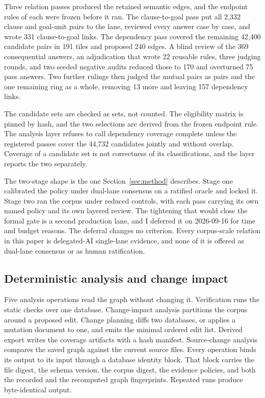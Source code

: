 Three relation passes produced the retained semantic edges, and the endpoint rules of each were frozen before it ran. The clause-to-goal pass put all 2{,}332 clause and goal-unit pairs to the lane, reviewed every answer case by case, and wrote 331 clause-to-goal links. The dependency pass covered the remaining 42{,}400 candidate pairs in 191 tiles and proposed 240 edges. A blind review of the 369 consequential answers, an adjudication that wrote 22 reusable rules, three judging rounds, and two seeded negative audits reduced those to 170 and overturned 75 pass answers. Two further rulings then judged the mutual pairs as pairs and the one remaining ring as a whole, removing 13 more and leaving 157 dependency links.

The candidate sets are checked as sets, not counted. The eligibility matrix is pinned by hash, and the two selections are derived from the frozen endpoint rule. The analysis layer refuses to call dependency coverage complete unless the registered passes cover the 44{,}732 candidates jointly and without overlap. Coverage of a candidate set is not correctness of its classifications, and the layer reports the two separately.

The two-stage shape is the one Section~\ref{sec:method} describes. Stage one calibrated the policy under dual-lane consensus on a ratified oracle and locked it. Stage two ran the corpus under reduced controls, with each pass carrying its own named policy and its own layered review. The tightening that would close the formal gate is a second production lane, and I deferred it on 2026-09-16 for time and budget reasons. The deferral changes no criterion. Every corpus-scale relation in this paper is delegated-AI single-lane evidence, and none of it is offered as dual-lane consensus or as human ratification.

\subsection{Deterministic analysis and change impact}

Five analysis operations read the graph without changing it. Verification runs the static checks over one database. Change-impact analysis partitions the corpus around a proposed edit. Change planning diffs two databases, or applies a mutation document to one, and emits the minimal ordered edit list. Derived export writes the coverage artifacts with a hash manifest. Source-change analysis compares the saved graph against the current source files. Every operation binds its output to its input through a database identity block. That block carries the file digest, the schema version, the corpus digest, the evidence policies, and both the recorded and the recomputed graph fingerprints. Repeated runs produce byte-identical output.

